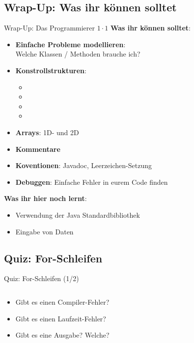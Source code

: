 \documentclass[usepdftitle=false,hyperref={pdfpagelabels=false}]{beamer}
\begin{document}
\subsection{Wrap-Up: Was ihr können solltet}
\begin{frame}{Wrap-Up: Das Programmierer $1 \cdot 1$}
    \textbf{Was ihr können solltet}:
    \begin{itemize}
        \item \textbf{Einfache Probleme modellieren}:\\
              Welche Klassen / Methoden brauche ich?
        \item \textbf{Konstrollstrukturen}:
          \begin{itemize}
            \item {}
            \item {}
            \item {}
            \item {}
          \end{itemize}
        \item \textbf{Arrays}: 1D- und 2D
        \item \textbf{Kommentare}
        \item \textbf{Koventionen}: Javadoc, Leerzeichen-Setzung
        \item \textbf{Debuggen}: Einfache Fehler in eurem Code finden
    \end{itemize}

    \textbf{Was ihr hier noch lernt}:
    \begin{itemize}
        \item Verwendung der Java Standardbibliothek
        \item Eingabe von Daten
    \end{itemize}
\end{frame}

\subsection{Quiz: For-Schleifen}
\begin{frame}{Quiz: For-Schleifen (1/2)}
    \inputminted[linenos=true, numbersep=5pt, tabsize=4, fontsize=\small, label=QuizFor.java, frame=lines]{java}{QuizFor.java}
    \begin{itemize}
        \item Gibt es einen Compiler-Fehler?
        \item Gibt es einen Laufzeit-Fehler?
        \item Gibt es eine Ausgabe? Welche?
    \end{itemize}
\end{frame}
\end{document}
